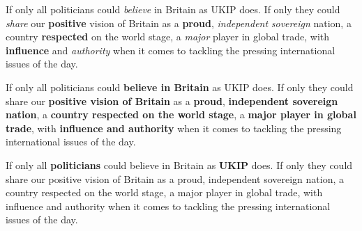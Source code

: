





If only all politicians could \textit<3->{believe} in Britain as UKIP does. If only they could \textit<3->{share} our \textbf<2->{positive} vision of Britain as a \textbf<2->{proud}, \textit<3->{independent} \textit<3->{sovereign} nation, a country \textbf<2->{respected} on the world stage, a \textit<3->{major} player in global trade, with \textbf<2->{influence} and \textit<3->{authority} when it comes to tackling the pressing international issues of the day.







If only all politicians could \textbf<2>{believe in Britain} as UKIP does. If only they could share our \textbf<2>{positive vision of Britain} as a \textbf<2>{proud}, \textbf<3-4>{independent sovereign nation}, a \textbf<4>{country respected on the world stage}, a \textbf<4>{major player in global trade}, with \textbf<4>{influence and authority} when it comes to tackling the pressing international issues of the day.




If only all \textbf<2>{politicians} could believe in Britain as \textbf<2>{UKIP} does. If only they could share our positive vision of Britain as a proud, independent sovereign nation, a country respected on the world stage, a major player in global trade, with influence and authority when it comes to tackling the pressing international issues of the day.


